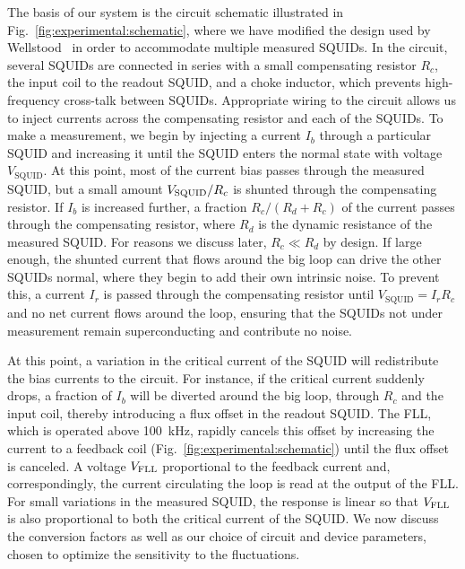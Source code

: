 The basis of our system is the circuit schematic illustrated in Fig.~\ref{fig:experimental:schematic}, where we have modified the design used by Wellstood~\citep{Wellstood:thesis} in order to accommodate multiple measured SQUIDs. In the circuit, several SQUIDs are connected in series with a small compensating resistor $R_c$, the input coil to the readout SQUID, and a choke inductor, which prevents high-frequency cross-talk between SQUIDs. Appropriate wiring to the circuit allows us to inject currents across the compensating resistor and each of the SQUIDs. To make a measurement, we begin by injecting a current $I_b$ through a particular SQUID and increasing it until the SQUID enters the normal state with voltage $V_{\text{SQUID}}$. At this point, most of the current bias passes through the measured SQUID, but a small amount $V_\text{SQUID}/R_c$ is shunted through the compensating resistor. If $I_b$ is increased further, a fraction $R_c/(R_d+R_c)$ of the current passes through the compensating resistor, where $R_d$ is the dynamic resistance of the measured SQUID. For reasons we discuss later, $R_c \ll R_d$ by design. If large enough, the shunted current that flows around the big loop can drive the other SQUIDs normal, where they begin to add their own intrinsic noise. To prevent this, a current $I_r$ is passed through the compensating resistor until $V_{\text{SQUID}} = I_r R_c$ and no net current flows around the loop, ensuring that the SQUIDs not under measurement remain superconducting and contribute no noise.

At this point, a variation in the critical current of the SQUID will redistribute the bias currents to the circuit. For instance, if the critical current suddenly drops, a fraction of $I_b$ will be diverted around the big loop, through $R_c$ and the input coil, thereby introducing a flux offset in the readout SQUID. The FLL, which is operated above 100~kHz, rapidly cancels this offset by increasing the current to a feedback coil (Fig.~\ref{fig:experimental:schematic}) until the flux offset is canceled. A voltage $V_\text{FLL}$ proportional to the feedback current and, correspondingly, the current circulating the loop is read at the output of the FLL. For small variations in the measured SQUID, the response is linear so that $V_\text{FLL}$ is also proportional to both the critical current of the SQUID. We now discuss the conversion factors as well as our choice of circuit and device parameters, chosen to optimize the sensitivity to the fluctuations.

